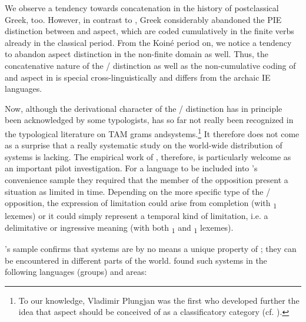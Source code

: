\documentclass[output=paper]{langsci/langscibook}
\begin{document}
We observe a tendency towards concatenation in the history of postclassical Greek, too. However, in contrast to , Greek considerably abandoned the PIE distinction between  and aspect, which are coded cumulatively in the finite verbs already in the classical period. From the Koiné period on, we notice a tendency to abandon aspect distinction in the non-finite domain as well. Thus, the concatenative nature of the / distinction as well as the non-cumulative coding of  and aspect in  is special cross-linguistically and differs from the archaic IE languages.

Now, although the derivational character of the  / distinction has in principle been acknowledged by some typologists,  has so far not really been recognized in the typological literature on TAM grams and\largerpage systems.\footnote{To our knowledge, Vladimir Plungjan was the first who developed further the idea that  aspect should be conceived of as a classificatory category (cf. \citealt[125–126]{Plungjan2000}).} It therefore does not come as a surprise that a really systematic study on the world-wide distribution of  systems is lacking. The empirical work of \citet{ArkadievShluinsky2015}, therefore, is particularly welcome as an important pilot investigation. For a language to be included into \citeauthor{ArkadievShluinsky2015}’s convenience sample they required that the  member of the opposition present a situation as limited in time. Depending on the more specific type of the / opposition, the expression of limitation could arise from completion (with \textsubscript{1} lexemes) or it could simply represent a temporal kind of limitation, i.e. a delimitative or ingressive meaning (with both \textsubscript{1} and \textsubscript{1} lexemes).

\citeauthor{ArkadievShluinsky2015}’s sample confirms that  systems are by no means a unique property of ; they can be encountered in different parts of the world.  \citeauthor{ArkadievShluinsky2015} found such systems in the following languages (groups) and areas:
\end{document}
